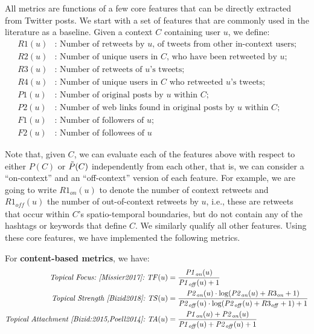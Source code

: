\documentclass[runningheads]{llncs}
\begin{document}
All metrics are functions of a few core features that can be directly extracted from Twitter posts. 
We start with a set of features that are commonly used in the literature as a baseline.
Given a context $C$ containing user $u$, we define:
%
\begin{align*}
\mathit{R1}(u) &\text{: Number of retweets by $u$, of tweets from other in-context users;}\\
\mathit{R2}(u)&\text{: Number of unique users in $C$, who have been retweeted by $u$;}\\
\mathit{R3}(u)&\text{: Number of retweets of $u$'s tweets;}\\
\mathit{R4}(u)&\text{: Number of unique users in $C$ who retweeted $u$'s tweets;}\\
\mathit{P1}(u)&\text{: Number of original posts by $u$ within $C$;}\\
\mathit{P2}(u)&\text{: Number of web links found in original posts by $u$ within $C$;} \\
\mathit{F1}(u)& \text{: Number of followers of $u$;}\\
\mathit{F2}(u)& \text{: Number of followees of $u$}
\end{align*}
%

Note that, given $C$, we can evaluate each of the features above with respect to either $P(C)$ or  $\Tilde{P}(C)$ independently from each other, that is, we can consider a ``on-context'' and an ``off-context'' version of each feature.
%
For example, we are going to write $R1_{on}(u)$ to denote the number of context retweets and $R1_{\mathit{off}}(u)$ the number of out-of-context retweets by $u$, i.e., these are retweets that occur within $C$'s spatio-temporal boundaries, but do not contain any of the hashtags or keywords that define $C$.  
%
We similarly qualify all other features.
%
Using these core features, we have implemented the following metrics.

For \textbf{content-based metrics}, we have:
\begin{align}
\textit{Topical Focus:~\cite{Missier2017}:} ~ \mathit{TF}(u) & =  \frac{\mathit{P1}_{\mathit{on}}(u)}{\mathit{P1}_{\mathit{off}}(u) +1}    \label{eq:TF}\\
\textit{Topical Strength~\cite{Bizid2018}:} ~\mathit{TS}(u) & =	\frac{\mathit{P2}_{\mathit{on}}(u) \cdot \log(\mathit{P2}_{\mathit{on}}(u) + R3_{\mathit{on}} +1 )}{\mathit{P2}_{\mathit{off}}(u) \cdot \log(\mathit{P2}_{\mathit{off}}(u) + R3_{\mathit{off}} +1 ) + 1}   \label{eq:TS} \\
\textit{Topical Attachment~\cite{Bizid:2015,Poell2014}:} ~\mathit{TA}(u) & = \frac{\mathit{P1}_{\mathit{on}}(u) + \mathit{P2}_{\mathit{on}}(u)}{\mathit{P1}_{\mathit{off}}(u) + \mathit{P2}_{\mathit{off}}(u) +1} \label{eq:TA}
\end{align}
\end{document}
